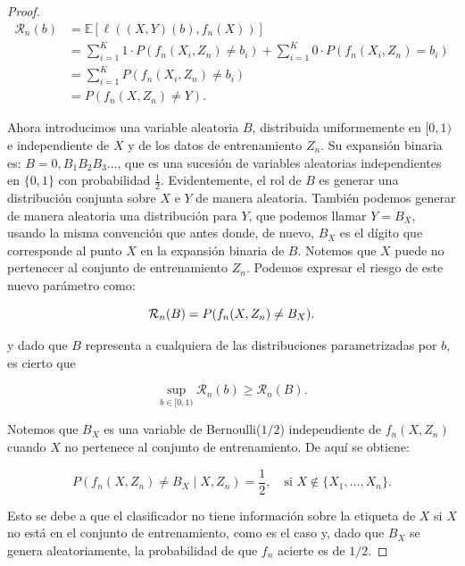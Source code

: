 \documentclass{report}
\begin{document}
\begin{proof}
\begin{equation*}
    \begin{aligned}
        \mathcal{R}_n(b) &= \mathbb{E}[\ell((X,Y)(b),f_n(X))]\\ 
        &= \sum_{i=1}^{K} 1 \cdot P(f_n(X_i, Z_n) \neq b_{i}) + \sum_{i=1}^{K} 0 \cdot P(f_n(X_i, Z_n) = b_{i})\\
        &= \sum_{i=1}^{K} P(f_n(X_i, Z_n) \neq b_{i}) \\
        &= P(f_n(X, Z_n) \neq Y).
    \end{aligned}
\end{equation*}


Ahora introducimos una variable aleatoria \(B\), distribuida uniformemente en \([0,1)\) e independiente de \(X\) y 
de los datos de entrenamiento \(Z_n\). Su expansión binaria es: \(B = 0,B_1B_2B_3\dots\), que es una sucesión 
de variables aleatorias independientes en \(\{0,1\}\) con probabilidad $\frac{1}{2}$. Evidentemente, el rol de $B$
es generar una distribución conjunta sobre $X$ e $Y$ de manera aleatoria. También podemos generar de manera aleatoria
una distribución para $Y$, que podemos llamar $Y=B_X$, usando la misma convención que antes donde, de nuevo,
$B_X$ es el dígito que corresponde al punto $X$ en la expansión binaria de $B$. Notemos que $X$ puede no pertenecer
al conjunto de entrenamiento $Z_n$. \newline
Podemos expresar el riesgo de este nuevo parámetro como:


\[
\mathcal{R}_n(B) = P(f_n(X, Z_n) \neq B_X).\newline
\]

y dado que $B$ representa a cualquiera de las distribuciones parametrizadas por $b$, es cierto que

\begin{equation}
    \sup_{b\in[0,1)} \mathcal{R}_n(b) \geq \mathcal{R}_n(B). \label{eq:cota_parametro_b_distribuciones}
\end{equation}



Notemos que \(B_X\) es una variable de Bernoulli(\(1/2\)) independiente de \(f_n(X, Z_n)\) cuando 
\(X\) no pertenece al conjunto de entrenamiento. De aquí se obtiene:

\[
P(f_n(X, Z_n) \neq B_X \mid X, Z_n) = \frac{1}{2}, \quad \text{si } X \notin \{X_1, \dots, X_n\}.
\]

Esto se debe a que el clasificador no tiene información sobre la etiqueta de \(X\) si \(X\) no está en el conjunto de entrenamiento,
como es el caso y, dado que $B_X$ se genera aleatoriamente, la probabilidad de que $f_n$ acierte es de $1/2$. \newline


\end{proof}
\end{document}
